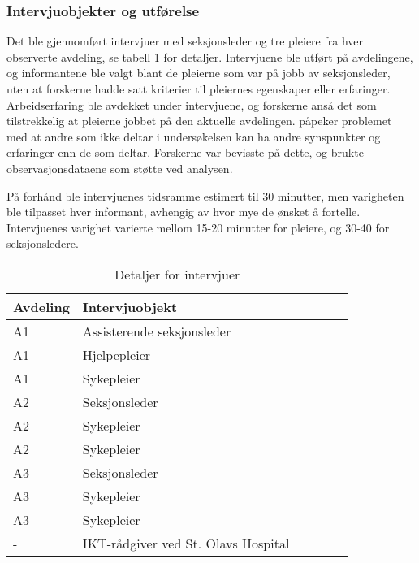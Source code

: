 \subsubsection{Intervjuobjekter og utførelse}
Det ble gjennomført intervjuer med seksjonsleder og tre pleiere fra hver observerte avdeling, se tabell \ref{detaljerintervju} for detaljer. Intervjuene ble utført på avdelingene, og informantene ble valgt blant de pleierne som var på jobb av seksjonsleder, uten at forskerne hadde satt kriterier til pleiernes egenskaper eller erfaringer. Arbeidserfaring ble avdekket under intervjuene, og forskerne anså det som tilstrekkelig at pleierne jobbet på den aktuelle avdelingen. \citet{Tjora} påpeker problemet med at andre som ikke deltar i undersøkelsen kan ha andre synspunkter og erfaringer enn de som deltar. Forskerne var bevisste på dette, og brukte observasjonsdataene som støtte ved analysen.
 
\noindent
På forhånd ble intervjuenes tidsramme estimert til 30 minutter, men varigheten ble tilpasset hver informant, avhengig av hvor mye de ønsket å fortelle. Intervjuenes varighet varierte mellom 15-20 minutter for pleiere, og 30-40 for seksjonsledere.
 
\begin{table}[H]\centering
    \begin{tabular}{ |l|l|l|l|l|l| }
    \hline
    Avdeling & Intervjuobjekt \\ \hline
       A1 & Assisterende seksjonsleder \\ \hline
       A1 & Hjelpepleier \\ \hline
       A1 & Sykepleier \\ \hline
       A2 & Seksjonsleder \\ \hline
       A2 & Sykepleier \\ \hline
       A2 & Sykepleier \\ \hline
       A3 & Seksjonsleder \\ \hline
       A3 & Sykepleier \\ \hline
       A3 & Sykepleier \\ \hline
       - & IKT-rådgiver ved St. Olavs Hospital \\ \hline
    \end{tabular}
    \caption {Detaljer for intervjuer}
    \label{detaljerintervju}
\end{table}
